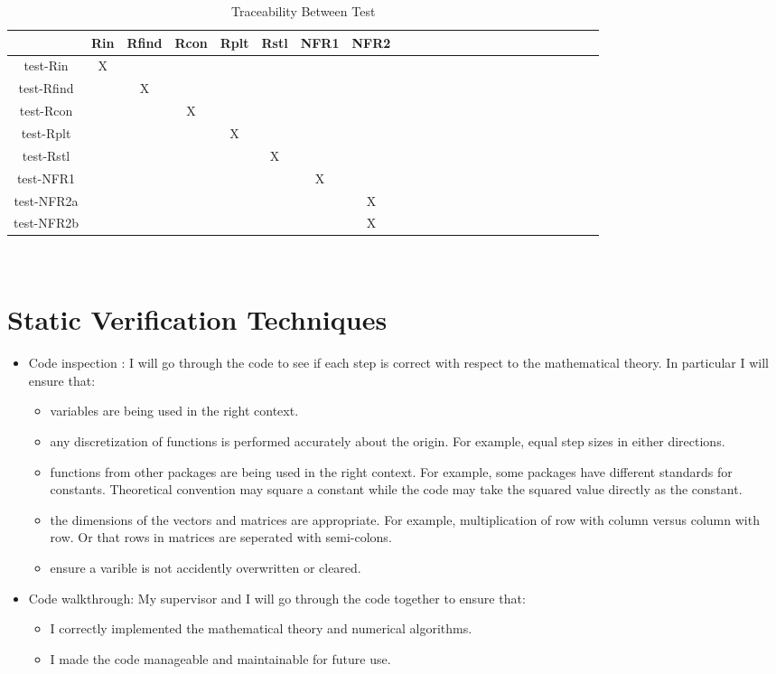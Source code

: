 \documentclass[12pt, titlepage]{article}
\begin{document}
\begin{table}[h]
	\centering
	\begin{tabular}{|c|c|c|c|c|c|c|c|c|c|c|c|c|c|c|c|c|c|c|c|c|c|c|c|}
		\hline        
		& Rin& Rfind & Rcon & Rplt & Rstl & NFR1 & NFR2 \\
		\hline
		test-Rin     &X & & & & & &  \\ \hline
		test-Rfind    & &X & & & & &  \\ \hline
		test-Rcon    & & &X & & & & \\ \hline 
		test-Rplt    & & & &X & & &   \\ \hline 
		test-Rstl    & & & & &X & &   \\ \hline 
		test-NFR1    & & & & & &X &   \\ \hline 
		test-NFR2a  & & & & & & &X   \\ \hline 
		test-NFR2b  & & & & & & &X   \\
		\hline
	\end{tabular}\\
	\caption{Traceability Between Test }
	\label{Table:D_1}
\end{table} 


\section{Static Verification Techniques}

\begin{itemize}
	\item Code inspection : I will 
	go through the code to see if each step is correct with respect to the
	mathematical theory. In particular I will ensure that: 
	\begin{itemize}
		\item variables are being used in the right context. 
		\item any discretization of functions is performed accurately about the 
		origin. For example, equal step sizes in either directions. 
		\item functions from other packages are being used in the right 
		context. For example, some packages have different standards for 
		constants. Theoretical convention may square a constant while the code 
		may take the squared value directly as the constant. 
		\item the dimensions of the vectors and matrices are appropriate. For 
		example, multiplication of row with column versus column with row. Or 
		that rows in matrices are seperated with semi-colons. 
		\item ensure a varible is not accidently overwritten or cleared. 
	\end{itemize} 
	\item Code walkthrough: My supervisor and I will go through the code 
	together to ensure that: 
	\begin{itemize}
		\item I correctly implemented the mathematical theory and numerical 
		algorithms.
		\item I made the code manageable and maintainable for future use.
	\end{itemize}
\end{itemize}
				
\end{document}

